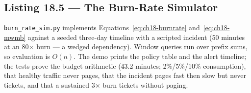 \subsection{Listing 18.5 --- The Burn-Rate Simulator}
\label{subsec:ch18-listing-burnrate}

\texttt{burn\_rate\_sim.py} implements Equations~\eqref{eq:ch18-burnrate}
and~\eqref{eq:ch18-mwmb} against a seeded three-day timeline with a
scripted incident (50 minutes at an 80$\times$ burn --- a wedged
dependency). Window queries run over prefix sums, so evaluation is $O(n)$.
The demo prints the policy table and the alert timeline; the tests prove
the budget arithmetic (43.2 minutes; 2\%/5\%/10\% consumption), that
healthy traffic never pages, that the incident pages fast then slow but
never tickets, and that a sustained 3$\times$ burn tickets without paging.

